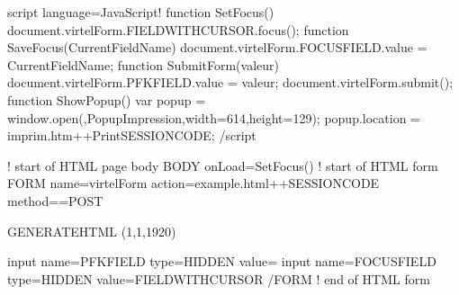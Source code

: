 \documentclass[letterpaper,10pt,english]{sphinxmanual}
\begin{document}
\begin{sphinxVerbatim}[commandchars=\\\{\}]
\PYGZlt{}script language=\PYGZdq{}JavaScript\PYGZdq{}\PYGZgt{}\PYGZlt{}!\PYGZhy{}\PYGZhy{} function SetFocus()
    \PYGZob{} document.virtelForm.\PYGZob{}\PYGZob{}\PYGZob{}FIELD\PYGZhy{}WITH\PYGZhy{}CURSOR\PYGZcb{}\PYGZcb{}\PYGZcb{}.focus(); \PYGZcb{} function
SaveFocus(CurrentFieldName)
    \PYGZob{} document.virtelForm.FOCUSFIELD.value = CurrentFieldName; \PYGZcb{}
function SubmitForm(valeur)
    \PYGZob{} document.virtelForm.PFKFIELD.value = valeur;
      document.virtelForm.submit(); \PYGZcb{}
function ShowPopup()
    \PYGZob{} var popup =
        window.open(\PYGZdq{}\PYGZdq{},\PYGZdq{}PopupImpression\PYGZdq{},\PYGZsq{}width=614,height=129\PYGZsq{});
        popup.location = \PYGZdq{}imprim.htm++Print\PYGZob{}\PYGZob{}\PYGZob{}SESSION\PYGZhy{}CODE\PYGZcb{}\PYGZcb{}\PYGZcb{}\PYGZdq{}; \PYGZcb{}    \PYGZhy{}\PYGZhy{}\PYGZgt{}\PYGZlt{}/script\PYGZgt{}

\PYGZlt{}!\PYGZhy{}\PYGZhy{}\PYGZhy{}\PYGZhy{}\PYGZhy{}\PYGZhy{}\PYGZhy{}\PYGZhy{}\PYGZhy{}\PYGZhy{}\PYGZhy{}\PYGZhy{}\PYGZhy{}\PYGZhy{}\PYGZhy{}\PYGZhy{}\PYGZhy{}\PYGZhy{}\PYGZhy{}\PYGZhy{}\PYGZhy{}\PYGZhy{} start of HTML page body    \PYGZhy{}\PYGZhy{}\PYGZhy{}\PYGZhy{}\PYGZhy{}\PYGZhy{}\PYGZhy{}\PYGZhy{}\PYGZhy{}\PYGZhy{}\PYGZhy{}\PYGZhy{}\PYGZhy{}\PYGZhy{}\PYGZhy{}\PYGZhy{}\PYGZhy{}\PYGZhy{}\PYGZhy{}\PYGZhy{}\PYGZgt{}
\PYGZlt{}BODY onLoad=\PYGZdq{}SetFocus()\PYGZdq{}\PYGZgt{}
\PYGZlt{}!\PYGZhy{}\PYGZhy{}\PYGZhy{}\PYGZhy{}\PYGZhy{}\PYGZhy{}\PYGZhy{}\PYGZhy{}\PYGZhy{}\PYGZhy{}\PYGZhy{}\PYGZhy{}\PYGZhy{}\PYGZhy{}\PYGZhy{}\PYGZhy{}\PYGZhy{}\PYGZhy{}\PYGZhy{}\PYGZhy{}\PYGZhy{}\PYGZhy{}\PYGZhy{}\PYGZhy{}\PYGZhy{} start of HTML form    \PYGZhy{}\PYGZhy{}\PYGZhy{}\PYGZhy{}\PYGZhy{}\PYGZhy{}\PYGZhy{}\PYGZhy{}\PYGZhy{}\PYGZhy{}\PYGZhy{}\PYGZhy{}\PYGZhy{}\PYGZhy{}\PYGZhy{}\PYGZhy{}\PYGZhy{}\PYGZhy{}\PYGZhy{}\PYGZhy{}\PYGZhy{}\PYGZhy{}\PYGZhy{}\PYGZgt{}
\PYGZlt{}FORM name=\PYGZdq{}virtelForm\PYGZdq{}
    action=\PYGZdq{}example.html++\PYGZob{}\PYGZob{}\PYGZob{}SESSION\PYGZhy{}CODE\PYGZcb{}\PYGZcb{}\PYGZcb{}\PYGZdq{}
    method==\PYGZdq{}POST\PYGZdq{}\PYGZgt{}

\PYGZob{}\PYGZob{}\PYGZob{} GENERATE\PYGZhy{}HTML (1,1,1920) \PYGZcb{}\PYGZcb{}\PYGZcb{}

\PYGZlt{}input name=\PYGZdq{}PFKFIELD\PYGZdq{} type=\PYGZdq{}HIDDEN\PYGZdq{} value=\PYGZdq{}\PYGZdq{}\PYGZgt{}
\PYGZlt{}input name=\PYGZdq{}FOCUSFIELD\PYGZdq{} type=\PYGZdq{}HIDDEN\PYGZdq{} value=\PYGZdq{}\PYGZob{}\PYGZob{}\PYGZob{}FIELD\PYGZhy{}WITH\PYGZhy{}CURSOR\PYGZcb{}\PYGZcb{}\PYGZcb{}\PYGZdq{}\PYGZgt{}
\PYGZlt{}/FORM\PYGZgt{}
\PYGZlt{}!\PYGZhy{}\PYGZhy{}\PYGZhy{}\PYGZhy{}\PYGZhy{}\PYGZhy{}\PYGZhy{}\PYGZhy{}\PYGZhy{}\PYGZhy{}\PYGZhy{}\PYGZhy{}\PYGZhy{}\PYGZhy{}\PYGZhy{}\PYGZhy{}\PYGZhy{}\PYGZhy{}\PYGZhy{}\PYGZhy{}\PYGZhy{} end of HTML form    \PYGZhy{}\PYGZhy{}\PYGZhy{}\PYGZhy{}\PYGZhy{}\PYGZhy{}\PYGZhy{}\PYGZhy{}\PYGZhy{}\PYGZhy{}\PYGZhy{}\PYGZhy{}\PYGZhy{}\PYGZhy{}\PYGZhy{}\PYGZhy{}\PYGZhy{}\PYGZhy{}\PYGZhy{}\PYGZhy{}\PYGZhy{}\PYGZhy{}\PYGZgt{}


\end{sphinxVerbatim}
\end{document}
